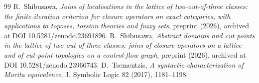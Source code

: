 \documentclass[11pt]{amsart}
\theoremstyle{definition}
\begin{document}
\begin{thebibliography}{99}
 R.~Shibusawa, \emph{Joins of localisations in the lattice of
two-out-of-three classes: the finite-iteration criterion for closure
operators on exact categories, with applications to toposes, torsion
theories and fuzzy sets}, preprint (2026), archived at DOI
10.5281/zenodo.23691896.
 R.~Shibusawa, \emph{Abstract domains and cut points in
the lattice of two-out-of-three classes: joins of closure operators on a
lattice and of cut-point topologies on a control-flow graph}, preprint
(2026), archived at DOI 10.5281/zenodo.23966743.
 D.~Tsementzis, \emph{A syntactic characterization of
Morita equivalence}, J. Symbolic Logic 82 (2017), 1181--1198.
\end{thebibliography}
\end{document}
